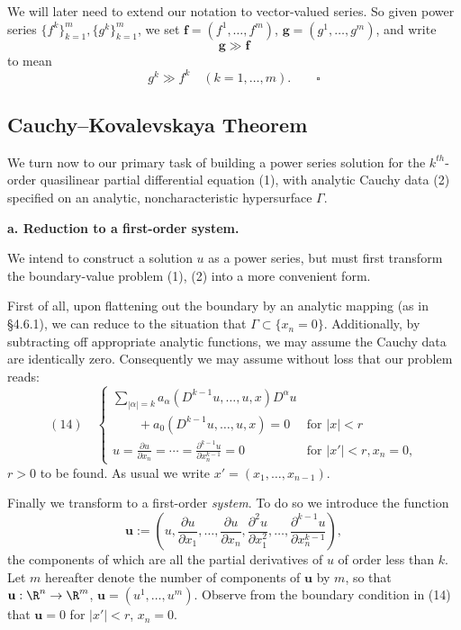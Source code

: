 \begin{remark}
\label{rem:vector-valued-power-series-notation}
We will later need to extend our notation to vector-valued series. So given power series $\{f^k\}_{k=1}^m,\{g^k\}_{k=1}^m$, we set $\mathbf{f}=(f^1,\ldots,f^m)$, $\mathbf{g}=(g^1,\ldots,g^m)$, and write
$$\mathbf{g}\gg\mathbf{f}$$
to mean
$$g^k \gg f^k \quad (k=1,\ldots,m). \qquad \square$$
\end{remark}

\subsection{Cauchy--Kovalevskaya Theorem}
\label{sec:cauchy-kovalevskaya-theorem}

We turn now to our primary task of building a power series solution for the $k^{th}$-order quasilinear partial differential equation (1), with analytic Cauchy data (2) specified on an analytic, noncharacteristic hypersurface $\Gamma$.

\textbf{a. Reduction to a first-order system.}

We intend to construct a solution $u$ as a power series, but must first transform the boundary-value problem (1), (2) into a more convenient form.

First of all, upon flattening out the boundary by an analytic mapping (as in \S4.6.1), we can reduce to the situation that $\Gamma\subset\{x_n=0\}$. Additionally, by subtracting off appropriate analytic functions, we may assume the Cauchy data are identically zero. Consequently we may assume without loss that our problem reads:
$$(14) \quad \begin{cases} \sum_{|\alpha|=k} a_\alpha(D^{k-1}u,\ldots,u,x)D^\alpha u \\ \qquad + a_0(D^{k-1}u,\ldots,u,x) = 0 & \text{for } |x|<r \\ u = \frac{\partial u}{\partial x_n} = \cdots = \frac{\partial^{k-1}u}{\partial x_n^{k-1}} = 0 & \text{for } |x'|<r, x_n=0, \end{cases}$$
$r>0$ to be found. As usual we write $x'=(x_1,\ldots,x_{n-1})$.

Finally we transform to a first-order \textit{system}. To do so we introduce the function
$$\mathbf{u} := \left(u, \frac{\partial u}{\partial x_1},\ldots,\frac{\partial u}{\partial x_n}, \frac{\partial^2 u}{\partial x_1^2},\ldots,\frac{\partial^{k-1}u}{\partial x_n^{k-1}}\right),$$
the components of which are all the partial derivatives of $u$ of order less than $k$. Let $m$ hereafter denote the number of components of $\mathbf{u}$ by $m$, so that $\mathbf{u}:\R^n\to\R^m$, $\mathbf{u}=(u^1,\ldots,u^m)$. Observe from the boundary condition in (14) that $\mathbf{u}=0$ for $|x'|<r$, $x_n=0$.

